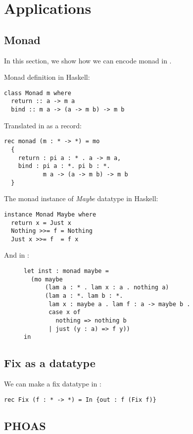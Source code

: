 
\section{Applications}
\label{sec:app}


\subsection{Monad}
\label{sec:monad}

In this section, we show how we can encode monad in \name.

Monad definition in Haskell:
\begin{lstlisting}
class Monad m where
  return :: a -> m a
  bind :: m a -> (a -> m b) -> m b
\end{lstlisting}

Translated in \name as a record:

\begin{lstlisting}
rec monad (m : * -> *) = mo
  {
    return : pi a : * . a -> m a,
    bind : pi a : *. pi b : *.
           m a -> (a -> m b) -> m b
  }
\end{lstlisting}

The monad instance of \emph{Maybe} datatype in Haskell:

\begin{lstlisting}
instance Monad Maybe where
  return x = Just x
  Nothing >>= f = Nothing
  Just x >>= f  = f x
\end{lstlisting}

And in \name:
\begin{figure}[ht]
  \centering
\begin{lstlisting}
let inst : monad maybe =
  (mo maybe
      (lam a : * . lam x : a . nothing a)
      (lam a : *. lam b : *.
       lam x : maybe a . lam f : a -> maybe b .
       case x of
         nothing => nothing b
       | just (y : a) => f y))
in
\end{lstlisting}
\end{figure}

\subsection{Fix as a datatype}
\label{sec:fix}

We can make a fix datatype in \name:
\begin{lstlisting}
rec Fix (f : * -> *) = In {out : f (Fix f)}
\end{lstlisting}


\subsection{PHOAS}
\label{sec:phoas}



